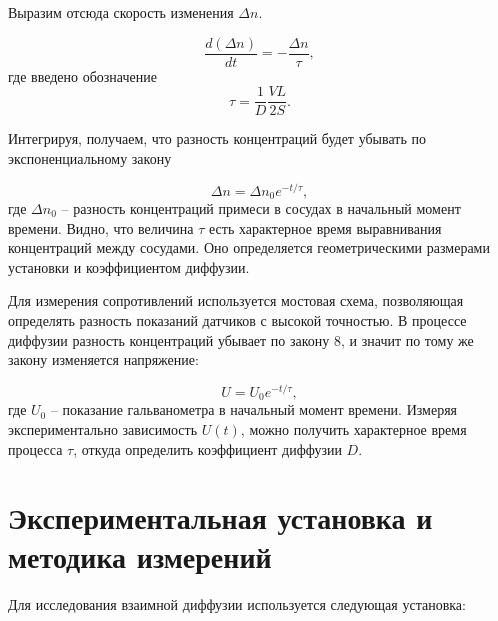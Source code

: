 \documentclass[a4paper,12pt]{article}
\begin{document}
    Выразим отсюда скорость изменения $ \Delta n $.

    \begin{equation}
        \frac{d(\Delta n)}{dt}=-\frac{\Delta n}{\tau},
    \end{equation}
        где введено обозначение
    \begin{equation}
        \tau=\frac{1}{D}\frac{VL}{2S}.
    \end{equation}
        
    Интегрируя, получаем, что разность концентраций будет убывать по экспоненциальному закону
        
    \begin{equation}
        \Delta n = \Delta n_0 e^{-t/\tau},
    \end{equation}
    где $ \Delta n_0 $ -- разность концентраций примеси в сосудах в начальный момент времени. Видно, что величина $ \tau $ есть характерное время выравнивания концентраций между сосудами. Оно определяется геометрическими размерами установки и коэффициентом диффузии.
        
    Для измерения сопротивлений используется мостовая схема, позволяющая определять разность показаний датчиков с высокой точностью. В процессе диффузии разность концентраций убывает по закону 8, и значит по тому же закону изменяется напряжение:

    \begin{equation}
        U=U_0e^{-t/\tau},
    \end{equation}
    где $ U_0 $ -- показание гальванометра в начальный момент времени. Измеряя экспериментально зависимость $ U(t) $, можно получить характерное время
    процесса $ \tau $, откуда определить коэффициент диффузии $ D $.


    \newpage
    \section{Экспериментальная установка и методика измерений}
	
	Для исследования взаимной диффузии используется следующая установка:
	
\end{document}
